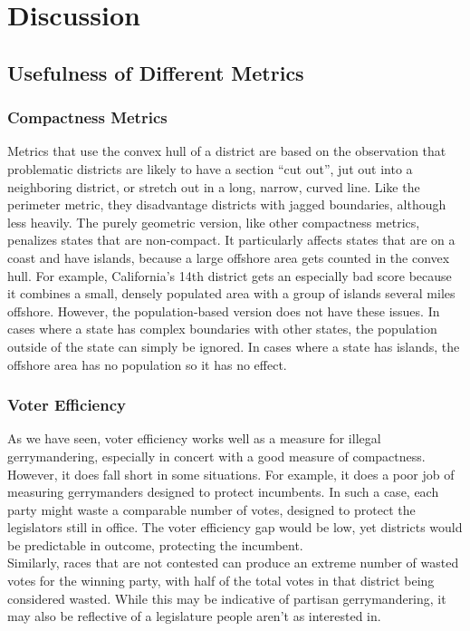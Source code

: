 \documentclass[12pt]{article}
\begin{document}
  \section{Discussion}
  \subsection{Usefulness of Different Metrics}
  \subsubsection{Compactness Metrics}
  Metrics that use the convex hull of a district are based on the observation that problematic districts are likely to have a section ``cut out'', jut out into a neighboring district, or stretch out in a long, narrow, curved line. Like the perimeter metric, they disadvantage districts with jagged boundaries, although less heavily. The purely geometric version, like other compactness metrics, penalizes states that are non-compact. It particularly affects states that are on a coast and have islands, because a large offshore area gets counted in the convex hull. For example, California's 14th district gets an especially bad score because it combines a small, densely populated area with a group of islands several miles offshore. However, the population-based version does not have these issues. In cases where a state has complex boundaries with other states, the population outside of the state can simply be ignored. In cases where a state has islands, the offshore area has no population so it has no effect.
  
  \subsubsection{Voter Efficiency}
  As we have seen, voter efficiency works well as a measure for illegal gerrymandering, especially in concert with a good measure of compactness.  However, it does fall short in some situations.  For example, it does a poor job of measuring gerrymanders designed to protect incumbents.  In such a case, each party might waste a comparable number of votes, designed to protect the legislators still in office.  The voter efficiency gap would be low, yet districts would be predictable in outcome, protecting the incumbent.\\
  
  Similarly, races that are not contested can produce an extreme number of wasted votes for the winning party, with half of the total votes in that district being considered wasted.  While this may be indicative of partisan gerrymandering, it may also be reflective of a legislature people aren't as interested in.\\
  
\end{document}
